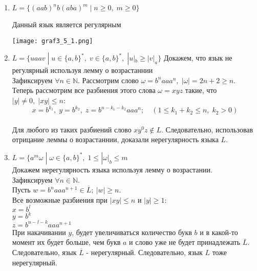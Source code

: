 \documentclass[12pt]{article}
\begin{document}
\begin{enumerate}
    \item $L = \{(aab)^nb(aba)^m \; | \; n \geq 0, \; m \geq 0\}$
    
   Данный язык является регулярным
    \begin{center}
        \texttt{[image: graf3\_5\_1.png]}
    \end{center}

    \item $L = \{uaav \; | \; u \in \{a, b\}^*, \; v \in \{a, b\}^*, \; |u|_b \geq |v|_a\}$
   Докажем, что язык не регулярный используя лемму о возрастаннии\\
    Зафиксируем $\forall n \in \mathbb{N} $. 
    Рассмотрим слово $\omega = b^naaa^n, \; |\omega| = 2n + 2 \geq n$.
    Теперь рассмотрим все разбиения этого слова $\omega = xyz$ такие, что $|y| \neq 0, \; |xy| \leq n$:
    $$x = b^{k_1}, \; y = b^{k_2}, \; z = b^{n-k_1-k_2}aaa^n; \quad (1 \leq k_1 + k_2 \leq n, \; k_2 > 0)$$\\
    Для любого из таких разбиений слово $xy^0z \notin L$. Следовательно, использовав  отрицание леммы о возрастаннии, доказали нерегулярность языка $L$.
    
     \item $L = \{a^m\omega \; | \; \omega \in \{a, b\}^*, \; 1 \leq|\omega|_b\leq m $ \\
     Докажем нерегулярность языка используя лемму о возрастании.\\
     Зафиксируем $\forall n \in \mathbb{N} $. \\
     Пусть $w=b^naaa^{n+1} \in \overline{L};\ |w| \geq n$. \\
     Все возможные разбиения при $|xy| \leq n$ и $|y| \geq 1$:\\
        $x=b^l$\\
        $y=b^k$\\
        $z=b^{n-l-k}aaa^{n+1}$\\
        При накачивании $y$, будет увеличиваться количество букв $b$ и в какой-то момент их будет больше, чем букв $a$ и слово уже не будет принадлежать $\overline{L}$. Следовательно, язык $\overline{L}$ - нерегулярный. Следовательно, язык $L$ тоже нерегулярный.
        

\end{enumerate}
\end{document}
